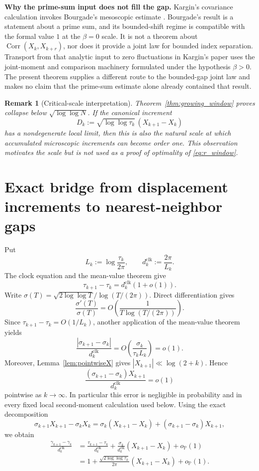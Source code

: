 \documentclass[pdflatex,sn-mathphys-num]{sn-jnl}
\numberwithin{equation}{section}
\theoremstyle{thmstyleone}
\theoremstyle{thmstylethree}
\theoremstyle{thmstyletwo}
\newtheorem{remark}[theorem]{Remark}
\newcommand{\Corr}{\operatorname{Corr}}
\newcommand{\1}{\mathbf 1}
\newcommand{\Prob}{\mathbb P}
\begin{document}
\medskip\noindent\textbf{Why the prime-sum input does not fill the gap.}
Kargin's covariance calculation invokes Bourgade's mesoscopic estimate
\cite{Bourgade2010}.  Bourgade's result is a statement about a prime sum,
and its bounded-shift regime is compatible with the formal value \(1\) at
the \(\beta=0\) scale.  It is not a theorem about
\(\Corr(X_k,X_{k+r})\), nor does it provide a joint law for bounded index
separation.  Transport from that analytic input to zero fluctuations in
Kargin's paper uses the joint-moment and comparison machinery formulated
under the hypothesis \(\beta>0\).  The present theorem supplies a different
route to the bounded-gap joint law and makes no claim that the prime-sum
estimate alone already contained that result.

\begin{remark}[Critical-scale interpretation]
\label{rem:critical_window_interpretation}
Theorem~\ref{thm:growing_window} proves collapse below
$\sqrt{\log\log N}$.  If the canonical increment
\[
 D_k:=\sqrt{\log\log\tau_k}\,(X_{k+1}-X_k)
\]
has a nondegenerate local limit, then this is also the natural scale at which accumulated
microscopic increments can become order one.  This observation motivates the scale but is
not used as a proof of optimality of \eqref{eq:r_window}.
\end{remark}

\section{Exact bridge from displacement increments to nearest-neighbor gaps}

Put
\[
 L_k:=\log\frac{\tau_k}{2\pi},
 \qquad
 d_k^{\mathrm{clk}}:=\frac{2\pi}{L_k}.
\]
The clock equation and the mean-value theorem give
\[
 \tau_{k+1}-\tau_k=d_k^{\mathrm{clk}}(1+o(1)).
\]
Write \(\sigma(T)=\sqrt{2\log\log T}/\log(T/(2\pi))\).  Direct
differentiation gives
\[
 \frac{\sigma'(T)}{\sigma(T)}
 =
 O\!\left(\frac1{T\log(T/(2\pi))}\right).
\]
Since \(\tau_{k+1}-\tau_k=O(1/L_k)\), another application of the
mean-value theorem yields
\[
 \frac{|\sigma_{k+1}-\sigma_k|}{d_k^{\mathrm{clk}}}
 =O\!\left(\frac{\sigma_k}{\tau_kL_k}\right)=o(1).
\]
Moreover, Lemma~\ref{lem:pointwiseX} gives
$|X_{k+1}|\ll\log(2+k)$.  Hence
\begin{equation}
 \frac{(\sigma_{k+1}-\sigma_k)X_{k+1}}{d_k^{\mathrm{clk}}}
 =o(1)
\label{eq:sigma_gap_error}
\end{equation}
pointwise as $k\to\infty$.  In particular this error is negligible in
probability and in every fixed local second-moment calculation used below.
Using the exact decomposition
\[
 \sigma_{k+1}X_{k+1}-\sigma_kX_k
 =
 \sigma_k(X_{k+1}-X_k)
 +(\sigma_{k+1}-\sigma_k)X_{k+1},
\]
we obtain
\begin{align}
 \frac{\gamma_{k+1}-\gamma_k}{d_k^{\mathrm{clk}}}
 &=
 \frac{\tau_{k+1}-\tau_k}{d_k^{\mathrm{clk}}}
 +
 \frac{\sigma_k}{d_k^{\mathrm{clk}}}
 (X_{k+1}-X_k)
 +o_{\Prob}(1)\\
 &=
 1+
 \frac{\sqrt{2\log\log\tau_k}}{2\pi}
 (X_{k+1}-X_k)
 +o_{\Prob}(1).
\label{eq:gapbridge}
\end{align}
\end{document}
